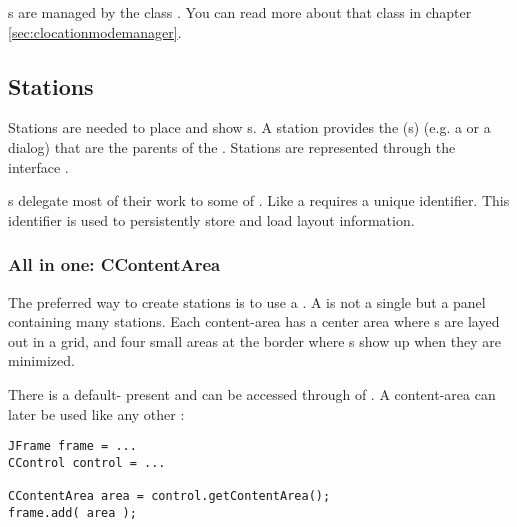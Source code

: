 s are managed by the class . You can read more about that class in chapter \ref{sec:clocationmodemanager}.

\subsection{Stations}
Stations are needed to place and show s. A station provides the (s) (e.g. a  or a dialog) that are the parents of the . Stations are represented through the interface .

s delegate most of their work to some  of . Like  a  requires a unique identifier. This identifier is used to persistently store and load layout information.


\subsubsection{All in one: CContentArea}
The preferred way to create stations is to use a . A  is not a single  but a panel containing many stations. Each content-area has a center area where s are layed out in a grid, and four small areas at the border where s show up when they are minimized.

There is a default- present and can be accessed through \linebreak {} of . A content-area can later be used like any other :
\begin{lstlisting}
JFrame frame = ...
CControl control = ...

CContentArea area = control.getContentArea();
frame.add( area );
\end{lstlisting}

